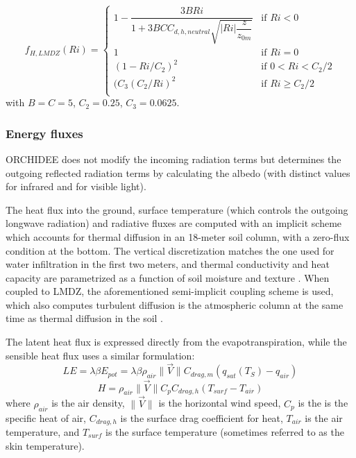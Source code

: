\begin{equation}
f_{H, LMDZ}(Ri) = 
\begin{cases}
1 - \dfrac{3 B Ri}{1 + 3 B C C_{d,h,neutral} \sqrt{|Ri| \dfrac{z}{z_{0m}}}} & \text{if } Ri < 0 \\
1 & \text{if } Ri=0\\
(1-Ri/C_2)^2 & \text{if } 0 < Ri < C_2/2\\
(C_3(C_2/Ri)^2 & \text{if } Ri \geq C_2/2\\
\end{cases}
\end{equation}
with $B=C=5$, $C_2 = 0.25$, $C_3 = 0.0625$.

\hfill

\subsubsection*{Energy fluxes}

ORCHIDEE does not modify the incoming radiation terms but determines the outgoing reflected radiation terms by calculating the albedo (with distinct values for infrared and for visible light).

The heat flux into the ground, surface temperature (which controls the outgoing longwave radiation) and radiative fluxes are computed with an implicit scheme which accounts for thermal diffusion in an 18-meter soil column, with a zero-flux condition at the bottom. 
The vertical discretization matches the one used for water infiltration in the first two meters, and thermal conductivity and heat capacity are parametrized as a function of soil moisture and texture \citep{wang_improvement_2016}.
When coupled to LMDZ, the aforementioned semi-implicit coupling scheme is used, which also computes turbulent diffusion is the atmospheric column at the same time as thermal diffusion in the soil \citep{polcher_proposal_1998, Hourdin_phdthesis,hourdin_parameterization_2002}. 

The latent heat flux is expressed directly from the evapotranspiration, while the sensible heat flux uses a similar formulation:
\begin{equation}
    LE = \lambda \beta E_{pot} = \lambda \beta \rho_{air} \lVert \vec{V} \rVert C_{drag, m} (q_{sat}(T_S) - q_{air})
\end{equation}
\begin{equation}
    H = \rho_{air}  \lVert \vec{V} \rVert C_p C_{drag, h} (T_{surf} - T_{air})
\end{equation}
where $\rho_{air}$ is the air density, $\lVert \vec{V} \rVert$ is the horizontal wind speed, $C_p$ is the is the specific heat of air, $C_{drag, h}$ is the surface drag coefficient for heat, $T_{air}$ is the air temperature, and $T_{surf}$ is the surface temperature (sometimes referred to as the skin temperature).


